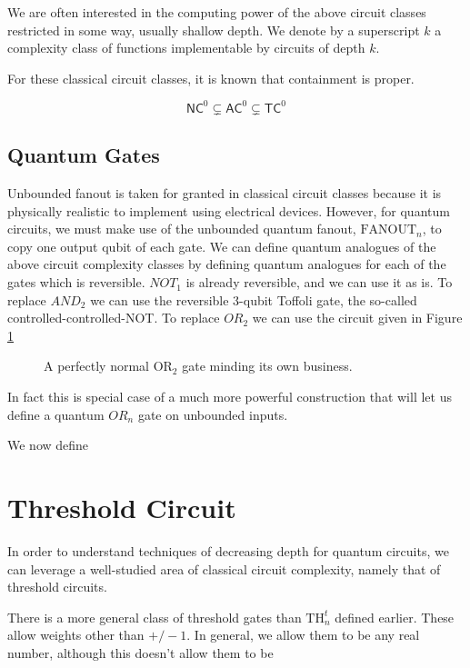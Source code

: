 We are often interested in the computing power of the above
circuit classes restricted in some way, usually shallow depth.
We denote by a superscript $k$ a complexity class of
functions implementable by circuits of depth $k$.

For these classical circuit classes, it is known that containment
is proper.

\begin{equation}
\textsf{NC}^0 \subsetneq \textsf{AC}^0 \subsetneq \textsf{TC}^0
\end{equation}

\subsection{Quantum Gates}

Unbounded fanout is taken for granted in classical circuit classes
because it is physically realistic to implement using electrical
devices. However, for quantum circuits, we must make use of the
unbounded quantum fanout, $\text{FANOUT}_n$, to copy one output
qubit of each gate.
We can define quantum analogues of the above circuit complexity 
classes by defining quantum analogues for each of the gates which
is reversible.
$NOT_1$ is already reversible, and we can use it as is.
To replace $AND_2$ we can use the reversible $3$-qubit Toffoli gate,
the so-called controlled-controlled-NOT.
To replace $OR_2$ we can use the circuit given in
Figure \ref{fig:or2}

\begin{figure}
\caption{A perfectly normal $\text{OR}_2$ gate minding its own business.}
\label{fig:or2}
\end{figure}

In fact this is special case of a much more powerful construction
that will let us define a quantum $OR_n$ gate on unbounded inputs.



We now define 

\section{Threshold Circuit}

In order to understand techniques of decreasing depth for quantum 
circuits, we can leverage a well-studied area of classical circuit
complexity, namely that of threshold circuits.

There is a more general class of threshold gates than $\text{TH}_n^t$
defined earlier. These allow weights other than $+/-1$. In general, we
allow them to be any real number, although this doesn't allow them to
be 

